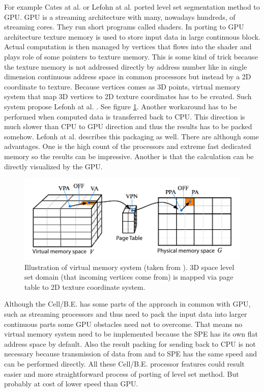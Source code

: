 \par
For example Cates at al. \cite{GIST} or Lefohn at al. \cite{lefonhGPUSolver} ported level set segmentation method to GPU.
GPU is a streaming architecture with many, nowadays hundreds, of streaming cores. They run short programs called shaders.
In porting to GPU architecture texture memory is used to store input data in large continuous block.
Actual computation is then managed by vertices that flows into the shader and plays role of some pointers to texture memory.
This is some kind of trick because the texture memory is not addressed directly by address number like in single dimension continuous address space in common processors but instead by a 2D coordinate to texture.
Because vertices comes as 3D points, virtual memory system that map 3D vertices to 2D texture coordinates has to be created.
Such system propose Lefonh at al. \cite{lefonhGPUSolver}. See figure \ref{fg:virtual memory on GPU}.
Another workaround has to be performed when computed data is transferred back to CPU.
This direction is much slower than CPU to GPU direction and thus the results has to be packed somehow.
Lefonh at al. \cite{lefonhGPUSolver} describes this packaging as well.
There are although some advantages.
One is the high count of the processors and extreme fast dedicated memory so the results can be impressive.
Another is that the calculation can be directly visualized by the GPU.

\begin{figure}
    \centering
    \includegraphics[width=\textwidth]{data/png/gpuVirtMemory}
    \caption[GPU virtual memory]{Illustration of virtual memory system (taken from \cite{lefonhGPUSolver}). 3D space level set domain (that incoming vertices come from) is mapped via page table to 2D texture coordinate system.}
    \label{fg:virtual memory on GPU}
\end{figure}

\par
Although the Cell/B.E. has some parts of the approach in common with GPU, such as streaming processors and thus need to pack the input data into larger continuous parts some GPU obstacles need not to overcome.
That means no virtual memory system need to be implemented because the SPE has its own flat address space by default.
Also the result packing for sending back to CPU is not necessary because transmission of data from and to SPE has the same speed and can be performed directly.
All these Cell/B.E. processor features could result easier and more straightforward process of porting of level set method.
But probably at cost of lower speed than GPU.
